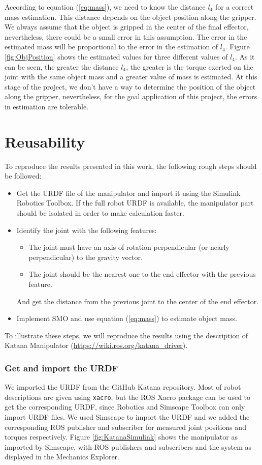 \documentclass[a4paper, 10pt]{article}
\begin{document}
According to equation (\ref{eq:mass}), we need to know the distance $l_4$ for a correct mass estimation. This distance depends on the object position along the gripper. We always assume that the object is gripped in the center of the final effector, nevertheless, there could be a small error in this assumption. The error in the estimated mass will be proportional to the error in the estimation of $l_4$. Figure \ref{fig:ObjPosition} shows the estimated values for three different values of $l_4$. As it can be seen, the greater the distance $l_4$, the greater is the torque exerted on the joint with the same object mass and a greater value of mass is estimated. At this stage of the project, we don't have a way to determine the position of the object along the gripper, nevertheless, for the goal application of this project, the errors in estimation are tolerable. 


\section{Reusability}
\label{sec:reusability}
To reproduce the results presented in this work, the following rough steps should be followed:
\begin{itemize}
\item Get the URDF file of the manipulator and import it using the Simulink Robotics Toolbox. If the full robot URDF is available, the manipulator part should be isolated in order to make calculation faster.
\item Identify the joint with the following features:
  \begin{itemize}
  \item The joint must have an axis of rotation perpendicular (or nearly perpendicular) to the gravity vector. 
  \item The joint should be the nearest one to the end effector with the previous feature. 
  \end{itemize}
  And get the distance from the previous joint to the center of the end effector.
\item Implement SMO and use equation (\ref{eq:mass}) to estimate object mass. 
\end{itemize}

To illustrate these steps, we will reproduce the results using the description of Katana Manipulator (\url{https://wiki.ros.org/katana_driver}).

\subsubsection*{Get and import the URDF}
We imported the URDF from the GitHub Katana repository. Most of robot descriptions are given using \texttt{xacro}, but the ROS Xacro package can be used to get the corresponding URDF, since Robotics and Simscape Toolbox can only import URDF files. We used Simscape to import the URDF and we added the corresponding ROS publisher and subscriber for measured joint positions and torques respectively. Figure \ref{fig:KatanaSimulink} shows the manipulator as imported by Simscape, with ROS publishers and subscribers and the system as displayed in the Mechanics Explorer. 
\end{document}

